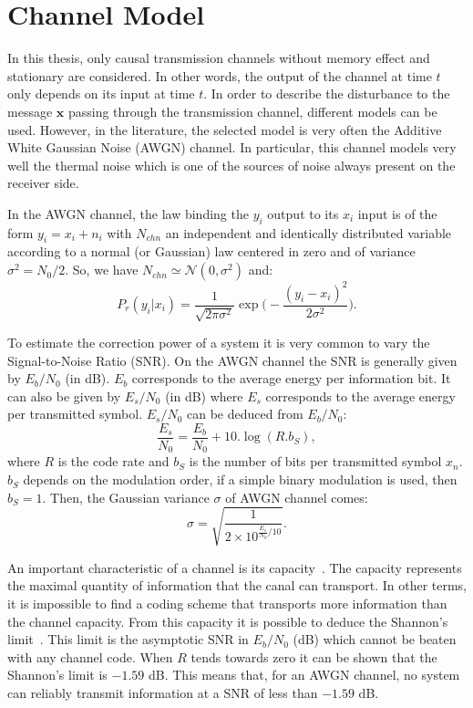 \section{Channel Model}

In this thesis, only causal transmission channels without memory effect and
stationary are considered. In other words, the output of the channel at time $t$
only depends on its input at time $t$. In order to describe the disturbance to
the message $\bm{x}$ passing through the transmission channel, different
models can be used. However, in the literature, the selected model is very
often the Additive White Gaussian Noise (AWGN) channel. In particular, this
channel models very well the thermal noise which is one of the sources of
noise always present on the receiver side.

In the AWGN channel, the law binding the $y_i$ output to its $x_i$ input is of
the form $y_i = x_i + n_i$ with $N_{chn}$ an independent and identically
distributed variable according to a normal (or Gaussian) law centered in zero
and of variance $\sigma^2 = N_0 / 2$. So, we have $N_{chn} \simeq \mathcal{N}(0,
\sigma^2)$ and:
\begin{equation}
P_r(y_i|x_i) = \frac{1}{\sqrt{2\pi\sigma^2}}\exp{\Big(-\frac{(y_i-x_i)^2}{2\sigma^2}\Big)}.
\end{equation}

To estimate the correction power of a system it is very common to vary the
Signal-to-Noise Ratio (SNR). On the AWGN channel the SNR is generally given by
$E_b/N_0$ (in dB). $E_b$ corresponds to the average energy per information bit.
It can also be given by $E_s/N_0$ (in dB) where $E_s$ corresponds to the average
energy per transmitted symbol. $E_s/N_0$ can be deduced from $E_b/N_0$:
\begin{equation}
\frac{E_s}{N_0} = \frac{E_b}{N_0} + 10.\log{(R.b_S)},
\end{equation}
where $R$ is the code rate and $b_S$ is the number of bits per transmitted
symbol $x_n$. $b_S$ depends on the modulation order, if a simple binary modulation
is used, then $b_S = 1$. Then, the Gaussian variance $\sigma$ of AWGN channel
comes:
\begin{equation}
\sigma = \sqrt{\frac{1}{2 \times 10^{\frac{E_s}{N_0} / 10}}}.
\end{equation}

An important characteristic of a channel is its capacity~\cite{Ryan2009}. The
capacity represents the maximal quantity of information that the canal can
transport. In other terms, it is impossible to find a coding scheme that
transports more information than the channel capacity.
From this capacity it is possible to deduce the Shannon's
limit~\cite{Shannon1948}. This limit is the asymptotic SNR in $E_b/N_0$ (dB)
which cannot be beaten with any channel code. When $R$ tends towards zero it can
be shown that the Shannon's limit is $-1.59$ dB. This means that, for an AWGN
channel, no system can reliably transmit information at a SNR of less than
$-1.59$ dB.

